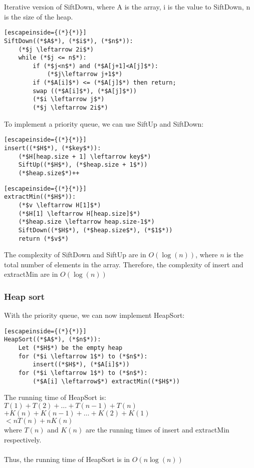 \documentclass[a4paper]{article}
\begin{document}
Iterative version of SiftDown, where A is the array, i is the value to SiftDown, n is the size of the heap.
\begin{lstlisting}[escapeinside={(*}{*)}]
SiftDown((*$A$*), (*$i$*), (*$n$*)):
	(*$j \leftarrow 2i$*)
	while (*$j <= n$*):
		if (*$j<n$*) and (*$A[j+1]<A[j]$*):
			(*$j\leftarrow j+1$*)
		if (*$A[i]$*) <= (*$A[j]$*) then return;
		swap ((*$A[i]$*), (*$A[j]$*))
		(*$i \leftarrow j$*)
		(*$j \leftarrow 2i$*)
\end{lstlisting}
To implement a priority queue, we can use SiftUp and SiftDown:
\begin{lstlisting}[escapeinside={(*}{*)}]
insert((*$H$*), (*$key$*)):
	(*$H[heap.size + 1] \leftarrow key$*)
	SiftUp((*$H$*), (*$heap.size + 1$*))
	(*$heap.size$*)++
\end{lstlisting}
\begin{lstlisting}[escapeinside={(*}{*)}]
extractMin((*$H$*)):
	(*$v \leftarrow H[1]$*)
	(*$H[1] \leftarrow H[heap.size]$*)
	(*$heap.size \leftarrow heap.size-1$*)
	SiftDown((*$H$*), (*$heap.size$*), (*$1$*))
	return (*$v$*)
\end{lstlisting}
The complexity of SiftDown and SiftUp are in $O(\log(n))$, where $n$ is the total number of elements in the array. Therefore, the complexity of insert and extractMin are in $O(\log(n))$
\subsubsection{Heap sort}
With the priority queue, we can now implement HeapSort:
\begin{lstlisting}[escapeinside={(*}{*)}]
HeapSort((*$A$*), (*$n$*)):
	Let (*$H$*) be the empty heap
	for (*$i \leftarrow 1$*) to (*$n$*):
		insert((*$H$*), (*$A[i]$*))
	for (*$i \leftarrow 1$*) to (*$n$*):
		(*$A[i] \leftarrow$*) extractMin((*$H$*))
\end{lstlisting}
The running time of HeapSort is:\\
$T(1) + T(2) + \dots + T(n-1) + T(n)$\\
$ + K(n) + K(n-1) + \dots + K(2) + K(1)$\\
$<nT(n) + nK(n)$\\
where $T(n)$ and $K(n)$ are the running times of insert and extractMin respectively.\\ \\
Thus, the running time of HeapSort is in $O(n\log(n))$
\end{document}
